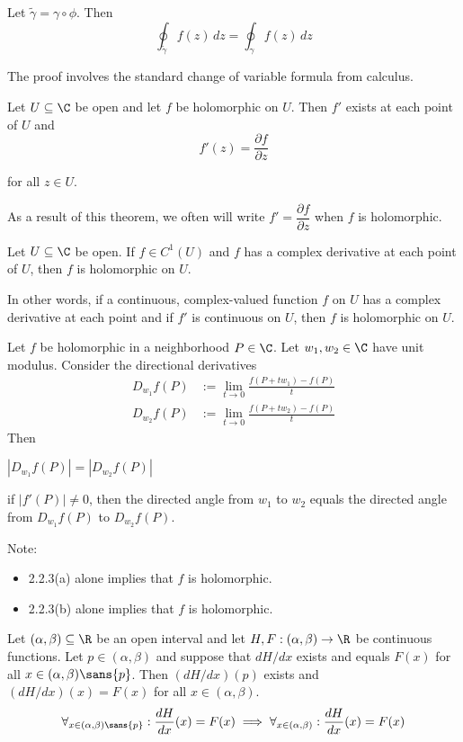 Let $\tilde\gamma=\gamma\circ\phi$. Then
$$\oint_{\tilde\gamma}f(z)\,dz=\oint_\gamma f(z)\,dz$$

The proof involves the standard change of variable formula from calculus.

\label{f75e43c}

Let $U\subseteq\C$ be open and let $f$ be holomorphic on $U$. Then $f'$ exists
at each point of $U$ and
$$f'(z)=\frac{\partial f}{\partial z}$$

for all $z\in U$.

As a result of this theorem, we often will write $f'=\dfrac{\partial
  f}{\partial z}$ when $f$ is holomorphic.

\label{d037b0f}

Let $U\subseteq\C$ be open. If $f\in C^1(U)$ and $f$ has a complex derivative
at each point of $U$, then $f$ is holomorphic on $U$.

In other words, if a continuous, complex-valued function $f$ on $U$ has a
complex derivative at each point and if $f'$ is continuous on $U$, then $f$ is
holomorphic on $U$.

\label{c41052e}

Let $f$ be holomorphic in a neighborhood $P\in\C$. Let $w_1,w_2\in\C$ have unit
modulus. Consider the directional derivatives
\begin{align*}
  D_{w_1}f(P) & :=\lim_{t\to0}\frac{f(P+tw_1)-f(P)}t \\
  D_{w_2}f(P) & :=\lim_{t\to0}\frac{f(P+tw_2)-f(P)}t
\end{align*}
Then
\begin{enumerata}
  \item $|D_{w_1}f(P)|=|D_{w_2}f(P)|$
  \item if $|f'(P)|\neq0$, then the directed angle from $w_1$ to $w_2$ equals the
  directed angle from $D_{w_1}f(P)$ to $D_{w_2}f(P)$.
\end{enumerata}
Note:
\begin{itemize}
  \item 2.2.3(a) alone implies that $f$ is holomorphic.
  \item 2.2.3(b) alone implies that $f$ is holomorphic.
\end{itemize}

\label{f8abd8b}

Let $(\alpha,\beta)\subseteq\R$ be an open interval and let
$H,F:(\alpha,\beta)\to\R$ be continuous functions. Let $p\in(\alpha,\beta)$ and
suppose that $dH/dx$ exists and equals $F(x)$ for all
$x\in(\alpha,\beta)\sans{p}$. Then $(dH/dx)(p)$ exists and $(dH/dx)(x)=F(x)$
for all $x\in(\alpha,\beta)$.
$$
  \forall_{x\in(\alpha,\beta)\sans{p}}:\frac{dH}{dx}(x)=F(x)\implies
  \forall_{x\in(\alpha,\beta)}:\frac{dH}{dx}(x)=F(x)
$$

